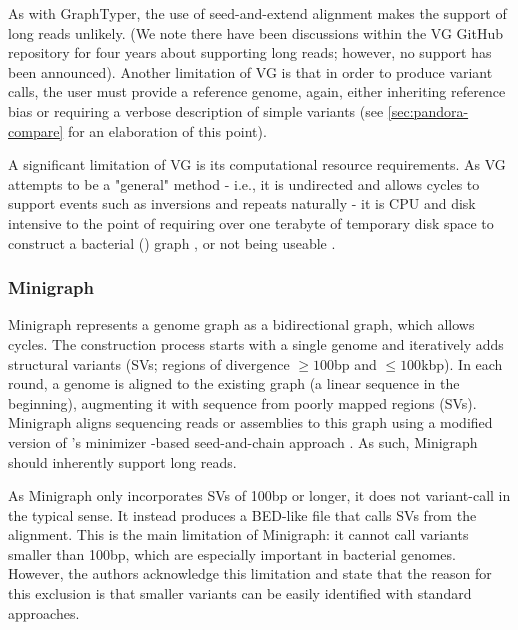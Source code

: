 As with GraphTyper, the use of seed-and-extend alignment makes the support of long reads unlikely. (We note there have been discussions within the VG GitHub repository for four years about supporting long reads; however, no support has been announced). Another limitation of VG is that in order to produce variant calls, the user must provide a reference genome, again, either inheriting reference bias or requiring a verbose description of simple variants (see \autoref{sec:pandora-compare} for an elaboration of this point).

A significant limitation of VG is its computational resource requirements. As VG attempts to be a "general" method - i.e., it is undirected and allows cycles to support events such as inversions and repeats naturally - it is CPU and disk intensive \cite{strainflair2021,gramtools2021,minigraph2020} to the point of requiring over one terabyte of temporary disk space to construct a bacterial (\mtb{}) graph \cite{gramtools2021}, or not being useable \cite{minigraph2020}.

\subsubsection{Minigraph}
Minigraph \cite{minigraph2020} represents a genome graph as a bidirectional graph, which allows cycles. The construction process starts with a single genome and iteratively adds structural variants (SVs; regions of divergence $\ge 100$bp and $\le 100$kbp). In each round, a genome is aligned to the existing graph (a linear sequence in the beginning), augmenting it with sequence from poorly mapped regions (SVs). Minigraph aligns sequencing reads or assemblies to this graph using a modified version of 's minimizer \kmer{}-based seed-and-chain approach \cite{li2018}. As such, Minigraph should inherently support long reads.

As Minigraph only incorporates SVs of 100bp or longer, it does not variant-call in the typical sense. It instead produces a BED-like file that calls SVs from the alignment. This is the main limitation of Minigraph: it cannot call variants smaller than 100bp, which are especially important in bacterial genomes. However, the authors acknowledge this limitation and state that the reason for this exclusion is that smaller variants can be easily identified with standard approaches. 

